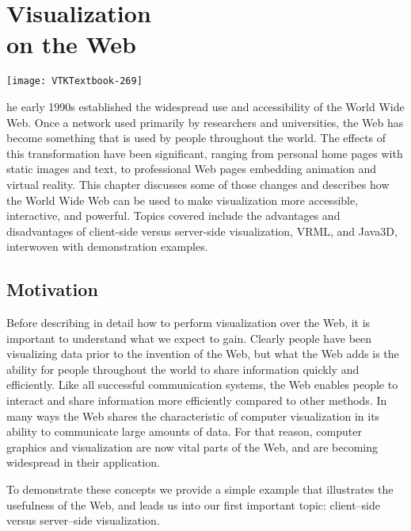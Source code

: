 \chapter[Visualization on the Web]{Visualization\\ on the Web}
\label{chap:visualization_web}

\vspace{-9\baselineskip} %
\hfill
 \begin{minipage}{0.5\textwidth}
 \centering
 \texttt{[image: VTKTextbook-269]}
 \end{minipage}
\vspace{2\baselineskip}

he early 1990s established the widespread use and accessibility of the World Wide Web.
Once a network used primarily by researchers and universities, the Web has become something that is used by people throughout the world.
The effects of this transformation have been significant, ranging from personal home pages with static images and text, to professional Web pages embedding animation and virtual reality.
This chapter discusses some of those changes and describes how the World Wide Web can be used to make visualization more accessible, interactive, and powerful.
Topics covered include the advantages and disadvantages of client-side versus server-side visualization, VRML, and Java3D, interwoven with demonstration examples.

\section{Motivation}
Before describing in detail how to perform visualization over the Web, it is important to understand what we expect to gain. Clearly people have been visualizing data prior to the invention of the Web, but what the Web adds is the ability for people throughout the world to share information quickly and efficiently.
Like all successful communication systems, the Web enables people to interact and share information more efficiently compared to other methods.
In many ways the Web shares the characteristic of computer visualization in its ability to communicate large amounts of data.
For that reason, computer graphics and visualization are now vital parts of the Web, and are becoming widespread in their application.

To demonstrate these concepts we provide a simple example that illustrates the usefulness of the Web, and leads us into our first important topic: client--side versus server--side visualization.


